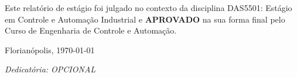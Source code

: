\documentclass[
	12pt,				%
	openright,			%
	oneside,			%
	a4paper,			%
	english,			%
	brazil				%
	]{abntex2}
\begin{document}
%
% 
%
\makeatletter
\begin{folhadeaprovacao}

  \begin{center}
    {\ABNTEXchapterfont\large\imprimirautor}

    \vspace*{\fill}\vspace*{\fill}
    \begin{center}
      \ABNTEXchapterfont\bfseries\Large\imprimirtitulo
    \end{center}
    \vspace*{\fill}
    
    Este relatório de estágio foi julgado no contexto da disciplina DAS5501: Estágio em Controle e Automação Industrial e \textbf{APROVADO} na sua forma final pelo Curso de Engenharia de Controle e Automação.
    
    \vspace*{\fill}
    
    Florianópolis, \today
  \end{center}
  
   
      
\makeatother
   
        
\end{folhadeaprovacao}

\begin{dedicatoria}
   \vspace*{\fill}
   \centering
   \noindent
   \textit{Dedicatória: OPCIONAL} \vspace*{\fill}
\end{dedicatoria}
\end{document}

